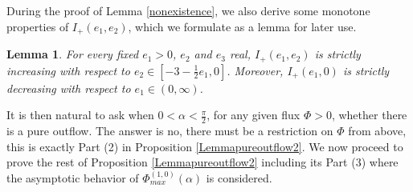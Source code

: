 \documentclass[reqno,12pt]{amsart}
\newtheorem{lemma}[theorem]{Lemma}
\begin{document}
During the proof of Lemma \ref{nonexistence}, we also derive some monotone properties of $I_{+}(e_1, e_2)$, which we formulate as a lemma for later use. 

\begin{lemma}\label{monotone}
    For every fixed $e_1>0$, $e_2$ and $e_3$ real, $I_{+}(e_1, e_2)$ is strictly increasing with respect to $e_2\in [-3-\frac12 e_1, 0]$. Moreover, $I_{+}(e_1, 0)$ is strictly decreasing with respect to $e_1\in (0, \infty)$. 
\end{lemma}

\vspace{3mm}
It is then natural to ask when $0<\alpha <\frac{\pi}{2}$, for any given flux $\Phi>0$, whether there is a pure outflow. The answer is no, there must be a restriction on $\Phi$ from above, this is exactly Part (2) in Proposition \ref{Lemmapureoutflow2}.
We now proceed to prove the rest of Proposition \ref{Lemmapureoutflow2} including its Part (3) where the asymptotic behavior of  $\Phi_{max}^{(1,0)}(\alpha)$ is considered.
\end{document}
